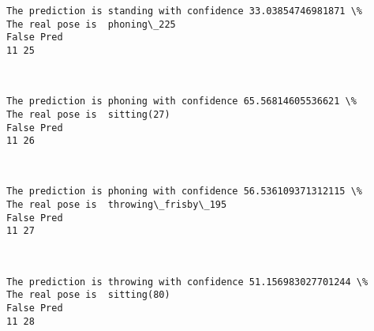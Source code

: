 \documentclass[11pt]{article}
\begin{document}
    \begin{Verbatim}[commandchars=\\\{\}]
The prediction is standing with confidence 33.03854746981871 \%
The real pose is  phoning\_225
False Pred
11 25

    \end{Verbatim}

    \begin{center}
    \end{center}
    { \hspace*{\fill} \\}
    
    \begin{Verbatim}[commandchars=\\\{\}]
The prediction is phoning with confidence 65.56814605536621 \%
The real pose is  sitting(27)
False Pred
11 26

    \end{Verbatim}

    \begin{center}
    \end{center}
    { \hspace*{\fill} \\}
    
    \begin{Verbatim}[commandchars=\\\{\}]
The prediction is phoning with confidence 56.536109371312115 \%
The real pose is  throwing\_frisby\_195
False Pred
11 27

    \end{Verbatim}

    \begin{center}
    \end{center}
    { \hspace*{\fill} \\}
    
    \begin{Verbatim}[commandchars=\\\{\}]
The prediction is throwing with confidence 51.156983027701244 \%
The real pose is  sitting(80)
False Pred
11 28

    \end{Verbatim}

    \begin{center}
    \end{center}
    { \hspace*{\fill} \\}
    
\end{document}
